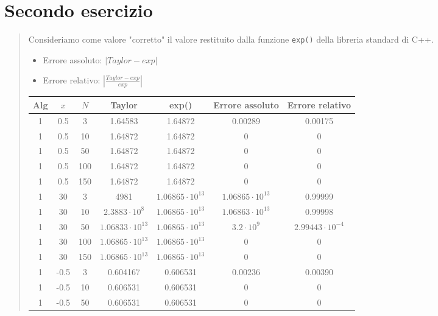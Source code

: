 \documentclass[10pt]{article}
\begin{document}
\section{Secondo esercizio}
\begin{quote}
    Consideriamo come valore "corretto" il valore restituito dalla funzione \texttt{exp()} della libreria standard di C++.
    \begin{itemize}
        \item Errore assoluto: $|Taylor-exp|$
        \item Errore relativo: $\left |\frac{Taylor-exp}{exp}\right |$
    \end{itemize}
    \begin{tabular}{| c | c | c | c | c | c | c |}
        \hline
        \textbf{Alg} & \textbf{$x$} & \textbf{$N$} & \textbf{Taylor} & \textbf{exp()} & \textbf{Errore assoluto} & \textbf{Errore relativo}\\
        \hline
        1 & 0.5 & 3 & 1.64583 & 1.64872 & 0.00289 & 0.00175 \\
        \hline
        1 & 0.5 & 10 & 1.64872 & 1.64872 & 0 & 0 \\
        \hline
        1 & 0.5 & 50 & 1.64872 & 1.64872 & 0 & 0 \\
        \hline 
        1 & 0.5 & 100 & 1.64872 & 1.64872 & 0 & 0 \\
        \hline
        1 & 0.5 & 150 & 1.64872 & 1.64872 & 0 & 0 \\
        \hline
        1 & 30 & 3 & 4981 & $1.06865\cdot10^{13}$ & $1.06865\cdot10^{13}$ & 0.99999 \\
        \hline
        1 & 30 & 10 & $2.3883\cdot10^{8}$ & $1.06865\cdot10^{13}$ & $1.06863\cdot10^{13}$ & 0.99998 \\
        \hline
        1 & 30 & 50 & $1.06833\cdot10^{13}$ & $1.06865\cdot10^{13}$ & $3.2\cdot10^{9}$ & $2.99443\cdot10^{-4}$ \\
        \hline
        1 & 30 & 100 & $1.06865\cdot10^{13}$ & $1.06865\cdot10^{13}$ & 0 & 0 \\
        \hline
        1 & 30 & 150 & $1.06865\cdot10^{13}$ & $1.06865\cdot10^{13}$ & 0 & 0 \\
        \hline
        1 & -0.5 & 3 & 0.604167 & 0.606531 & 0.00236 & 0.00390 \\
        \hline
        1 & -0.5 & 10 & 0.606531 & 0.606531 & 0 & 0 \\
        \hline
        1 & -0.5 & 50 & 0.606531 & 0.606531 & 0 & 0 \\
        \hline

\end{tabular}
\end{quote}
\end{document}
